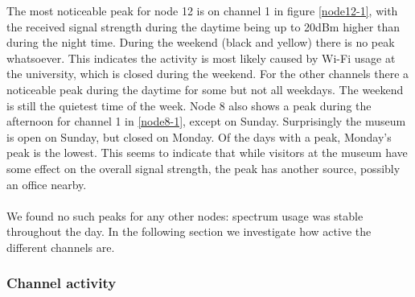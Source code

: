\documentclass[a4paper, 11pt]{article}
\begin{document}
The most noticeable peak for node 12 is on channel 1 in figure \ref{node12-1}, with the received signal strength during the daytime being up to 20dBm higher than during the night time. During the weekend (black and yellow) there is no peak whatsoever. This indicates the activity is most likely caused by Wi-Fi usage at the university, which is closed during the weekend. For the other channels there a noticeable peak during the daytime for some but not all weekdays. The weekend is still the quietest time of the week. Node 8 also shows a peak during the afternoon for channel 1 in \ref{node8-1}, except on Sunday. Surprisingly the museum is open on Sunday, but closed on Monday. Of the days with a peak, Monday's peak is the lowest. This seems to indicate that while visitors at the museum have some effect on the overall signal strength, the peak has another source, possibly an office nearby. \\ \\
We found no such peaks for any other nodes: spectrum usage was stable throughout the day. In the following section we investigate how active the different channels are.


\subsubsection{Channel activity}
\end{document}
